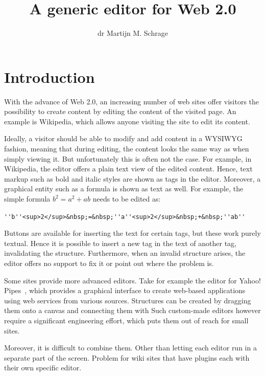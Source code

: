 \documentclass[10pt]{article}
\title{A generic editor for Web 2.0}
\author{dr Martijn M. Schrage}
\date{\version}
\begin{document}
\maketitle

\section{Introduction}


With the advance of Web 2.0, an increasing number of web sites offer visitors the possibility to create content by editing the content of the visited page. An example is Wikipedia, which allows anyone visiting the site to edit its content. 


Ideally, a visitor should be able to modify and add content in a WYSIWYG fashion, meaning that during editing, the content looks the same way as when simply viewing it. But unfortunately this is often not the case. For example, in Wikipedia, the editor offers a plain text view of the edited content. Hence, text markup such as bold and italic styles are shown as tags in the editor. Moreover, a graphical entity such as a formula is shown as text as well. For example, the simple formula $b^2 = a^2 + ab$ needs to be edited as:
 
\verb|''b''<sup>2</sup>&nbsp;=&nbsp;''a''<sup>2</sup>&nbsp;+&nbsp;''ab''|

Buttons are available for inserting the text for certain tags, but these work purely textual. Hence it is possible to insert a new tag in the text of another tag, invalidating the structure. Furthermore, when an invalid structure arises, the editor offers no support to fix it or point out where the problem is. 


Some sites provide more advanced editors. Take for example the editor for Yahoo! Pipes~\cite{yahoo08pipes}, which provides a graphical interface to create web-based applications using web services from various sources. Structures can be created by dragging them onto a canvas and connecting them with  Such custom-made editors however require a significant engineering effort, which puts them out of reach for small sites.

Moreover, it is difficult to combine them. Other than letting each editor run in a separate part of the screen. Problem for wiki sites that have plugins each with their own specific editor. 
\end{document}
